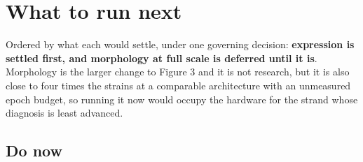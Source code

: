 
\section{What to run next}
\label{sec:directions}

Ordered by what each would settle, under one governing decision: \textbf{expression is
settled first, and morphology at full scale is deferred until it is}. Morphology is the
larger change to Figure 3 and it is not research, but it is also close to four times the
strains at a comparable architecture with an unmeasured epoch budget, so running it now
would occupy the hardware for the strand whose diagnosis is least advanced.

\subsection{Do now}

